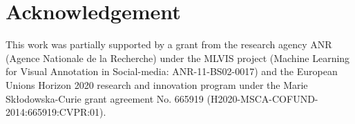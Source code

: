 \documentclass[journal]{IEEEtran}
\theoremstyle{definition}
\begin{document}
\section*{Acknowledgement}
{This work was partially supported by a grant from the research agency ANR (Agence Nationale de la Recherche) under the MLVIS project (Machine Learning for Visual Annotation in Social-media: ANR-11-BS02-0017) and the European Union\textquotesingle s Horizon 2020 research and innovation program under the Marie Sk\l{}odowska-Curie grant agreement No. 665919 (H2020-MSCA-COFUND-2014:665919:CVPR:01).}




\end{document}
